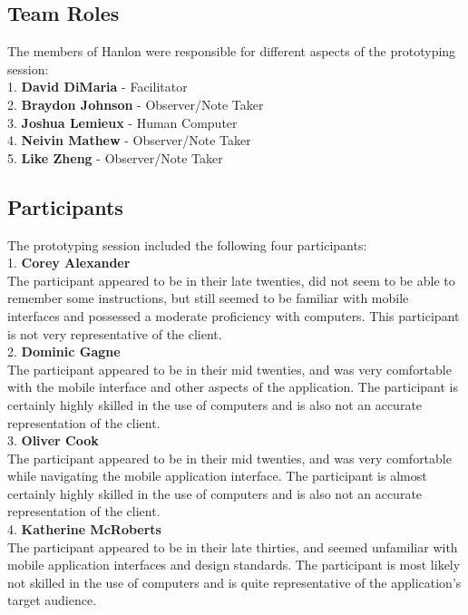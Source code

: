 \documentclass[12pt,letterpaper]{article}
\begin{document}
\subsection{Team Roles}
The members of Hanlon were responsible for different aspects of the prototyping session:\\
1. \textbf{\hspace*{8pt}David DiMaria} - Facilitator\\
2. \textbf{\hspace*{8pt}Braydon Johnson} - Observer/Note Taker\\
3. \textbf{\hspace*{8pt}Joshua Lemieux} - Human Computer\\
4. \textbf{\hspace*{8pt}Neivin Mathew} - Observer/Note Taker\\
5. \textbf{\hspace*{8pt}Like Zheng} - Observer/Note Taker
\subsection{Participants}
The prototyping session included the following four participants:\\
1.\hspace*{8pt} \textbf{Corey Alexander}\\
The participant appeared to be in their late twenties, did not seem to be able to remember some instructions, but still seemed to be familiar with mobile interfaces and possessed a moderate proficiency with computers. This participant is not very representative of the client.\\[0.5\baselineskip]
2.\hspace*{8pt} \textbf{Dominic Gagne}\\
The participant appeared to be in their mid twenties, and was very comfortable with the mobile interface and other aspects of the application. The participant is certainly highly skilled in the use of computers and is also not an accurate representation of the client.\\[0.5\baselineskip]
3.\hspace*{8pt} \textbf{Oliver Cook}\\
The participant appeared to be in their mid twenties, and was very comfortable while navigating the mobile application interface. The participant is almost certainly highly skilled in the use of computers and is also not an accurate representation of the client.\\[0.5\baselineskip]
4.\hspace*{8pt} \textbf{Katherine McRoberts}\\
The participant appeared to be in their late thirties, and seemed unfamiliar with mobile application interfaces and design standards. The participant is most likely not skilled in the use of computers and is quite representative of the application's target audience.
 
\end{document}
